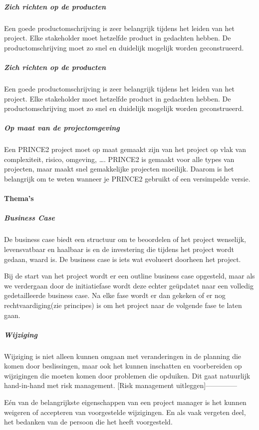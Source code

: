 \documentclass[]{article}
\begin{document}
\subparagraph{Zich richten op de producten}
Een goede productomschrijving is zeer belangrijk tijdens het leiden van het project. Elke stakeholder moet hetzelfde product in gedachten hebben. De productomschrijving moet zo snel en duidelijk mogelijk worden geconstrueerd.

\subparagraph{Zich richten op de producten}
Een goede productomschrijving is zeer belangrijk tijdens het leiden van het project. Elke stakeholder moet hetzelfde product in gedachten hebben. De productomschrijving moet zo snel en duidelijk mogelijk worden geconstrueerd.

\subparagraph{Op maat van de projectomgeving}
Een PRINCE2 project moet op maat gemaakt zijn van het project op vlak van complexiteit, risico, omgeving, …. PRINCE2 is gemaakt voor alle types van projecten, maar maakt snel gemakkelijke projecten moeilijk. Daarom is het belangrijk om te weten wanneer je PRINCE2 gebruikt of een versimpelde versie.


\paragraph{Thema's}
\subparagraph{Business Case}
De business case biedt een structuur om te beoordelen of het project wenselijk, levensvatbaar en haalbaar is en de investering die tijdens het project wordt gedaan, waard is. De business case is iets wat evolueert doorheen het project. 

Bij de start van het project wordt er een outline business case opgesteld, maar als we verdergaan door de initiatiefase wordt deze echter geüpdatet naar een volledig gedetailleerde business case. Na elke fase wordt er dan gekeken of er nog rechtvaardiging(zie principes) is om het project naar de volgende fase te laten gaan.

\subparagraph{Wijziging}
Wijziging is niet alleen kunnen omgaan met veranderingen in de planning die komen door beslissingen, maar ook het kunnen inschatten en voorbereiden op wijzigingen die moeten komen door problemen die opduiken. Dit gaat natuurlijk hand-in-hand met risk management.
[Risk management uitleggen]--------------

Eén van de belangrijkste eigenschappen van een project manager is het kunnen weigeren of accepteren van voorgestelde wijzigingen. En als vaak vergeten deel, het bedanken van de persoon die het heeft voorgesteld.
\end{document}

